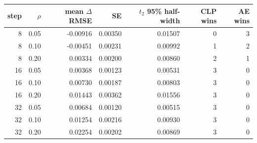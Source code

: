 \begin{tabular}{rrrrrrr}
\toprule
step & $\rho$ & mean $\Delta$RMSE & SE & $t_{2}$ 95\% half-width & CLP wins & AE wins \\
\midrule
8 & 0.05 & -0.00916 & 0.00350 & 0.01507 & 0 & 3 \\
8 & 0.10 & -0.00451 & 0.00231 & 0.00992 & 1 & 2 \\
8 & 0.20 & 0.00334 & 0.00200 & 0.00860 & 2 & 1 \\
16 & 0.05 & 0.00368 & 0.00123 & 0.00531 & 3 & 0 \\
16 & 0.10 & 0.00730 & 0.00187 & 0.00803 & 3 & 0 \\
16 & 0.20 & 0.01443 & 0.00362 & 0.01556 & 3 & 0 \\
32 & 0.05 & 0.00684 & 0.00120 & 0.00515 & 3 & 0 \\
32 & 0.10 & 0.01254 & 0.00216 & 0.00930 & 3 & 0 \\
32 & 0.20 & 0.02254 & 0.00202 & 0.00869 & 3 & 0 \\
\bottomrule
\end{tabular}
